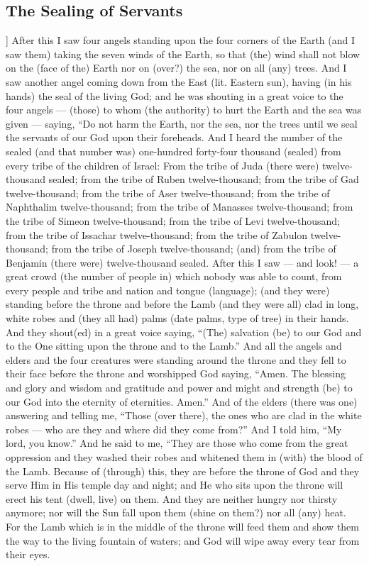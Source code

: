\begin{pages}
\begin{Leftside}
        			\chapter{The Sealing of Servants}
				]
		After this I saw four angels standing upon the four corners of the Earth (and I saw them) taking the seven winds of the Earth, so that (the) wind shall not blow on the (face of the) Earth nor on (over?) the sea, nor on all (any) trees.
		\pend
		\pstart
		And I saw another angel coming down from the East (lit. Eastern sun), having (in his hands) the seal of the living God; and he was shouting in a great voice to the four angels — (those) to whom (the authority) to hurt the Earth and the sea was given — saying, “Do not harm the Earth, nor the sea, nor the trees until we seal the servants of our God upon their foreheads. And I heard the number of the sealed (and that number was) one-hundred forty-four thousand (sealed) from every tribe of the children of Israel:
		\pend
		\pstart
		From the tribe of Juda (there were) twelve-thousand sealed; from the tribe of Ruben twelve-thousand; from the tribe of Gad twelve-thousand; from the tribe of Aser twelve-thousand; from the tribe of Naphthalim twelve-thousand; from the tribe of Manasses twelve-thousand; from the tribe of Simeon twelve-thousand; from the tribe of Levi twelve-thousand; from the tribe of Issachar twelve-thousand; from the tribe of Zabulon twelve-thousand; from the tribe of Joseph twelve-thousand; (and) from the tribe of Benjamin (there were) twelve-thousand sealed.
		\pend
		\pstart
		After this I saw — and look! — a great crowd (the number of people in) which nobody was able to count, from every people and tribe and nation and tongue (language); (and they were) standing before the throne and before the Lamb (and they were all) clad in long, white robes and (they all had) palms (date palms, type of tree) in their hands. And they shout(ed) in a great voice saying, “(The) salvation (be) to our God and to the One sitting upon the throne and to the Lamb.”
		\pend
		\pstart
		And all the angels and elders and the four creatures were standing around the throne and they fell to their face before the throne and worshipped God saying, “Amen. The blessing and glory and wisdom and gratitude and power and might and strength (be) to our God into the eternity of eternities. Amen.”
		\pend
		\pstart
		And of the elders (there was one) answering and telling me, “Those (over there), the ones who are clad in the white robes — who are they and where did they come from?” And I told him, “My lord, you know.” And he said to me, “They are those who come from the great oppression and they washed their robes and whitened them in (with) the blood of the Lamb. Because of (through) this, they are before the throne of God and they serve Him in His temple day and night; and He who sits upon the throne will erect his tent (dwell, live) on them. And they are neither hungry nor thirsty anymore; nor will the Sun fall upon them (shine on them?) nor all (any) heat. For the Lamb which is in the middle of the throne will feed them and show them the way to the living fountain of waters; and God will wipe away every tear from their eyes. 
		\pend
        \endnumbering
    \end{Leftside}


\end{pages}
